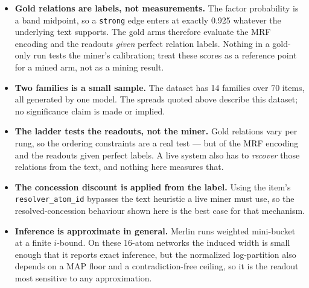 \documentclass[11pt]{article}
\begin{document}
\begin{itemize}
\item \textbf{Gold relations are labels, not measurements.} The factor probability is a band midpoint, so a \texttt{strong} edge enters at exactly 0.925 whatever the underlying text supports. The gold arms therefore evaluate the MRF encoding and the readouts \emph{given} perfect relation labels. Nothing in a gold-only run tests the miner's calibration; treat these scores as a reference point for a mined arm, not as a mining result.
\item \textbf{Two families is a small sample.} The dataset has 14 families over 70 items, all generated by one model. The spreads quoted above describe this dataset; no significance claim is made or implied.
\item \textbf{The ladder tests the readouts, not the miner.} Gold relations vary per rung, so the ordering constraints are a real test --- but of the MRF encoding and the readouts given perfect labels. A live system also has to \emph{recover} those relations from the text, and nothing here measures that.
\item \textbf{The concession discount is applied from the label.} Using the item's \texttt{resolver\_atom\_id} bypasses the text heuristic a live miner must use, so the resolved-concession behaviour shown here is the best case for that mechanism.
\item \textbf{Inference is approximate in general.} Merlin runs weighted mini-bucket at a finite $i$-bound. On these 16-atom networks the induced width is small enough that it reports exact inference, but the normalized log-partition also depends on a MAP floor and a contradiction-free ceiling, so it is the readout most sensitive to any approximation.
\end{itemize}
\end{document}
